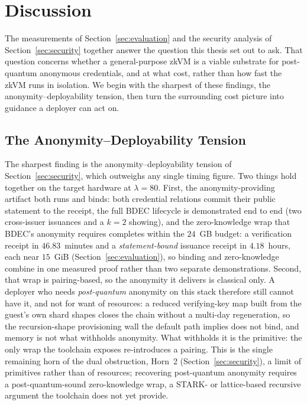 \section{Discussion}\label{sec:discussion}
The measurements of Section~\ref{sec:evaluation} and the security analysis of Section~\ref{sec:security} together answer the question this thesis set out to ask. That question concerns whether a general-purpose zkVM is a viable substrate for post-quantum anonymous credentials, and at what cost, rather than how fast the zkVM runs in isolation. We begin with the sharpest of these findings, the anonymity--deployability tension, then turn the surrounding cost picture into guidance a deployer can act on.

\subsection{The Anonymity--Deployability Tension}\label{ssec:tension-discussion}
The sharpest finding is the anonymity--deployability tension of Section~\ref{sec:security}, which outweighs any single timing figure. Two things hold together on the target hardware at $\lambda=80$. First, the anonymity-providing artifact both runs and binds: both credential relations commit their public statement to the receipt, the full BDEC lifecycle is demonstrated end to end (two cross-issuer issuances and a $k=2$ showing), and the zero-knowledge wrap that BDEC's anonymity requires completes within the $24$~GB budget: a verification receipt in $46.83$~minutes and a \emph{statement-bound} issuance receipt in $4.18$~hours, each near $15$~GiB (Section~\ref{sec:evaluation}), so binding and zero-knowledge combine in one measured proof rather than two separate demonstrations. Second, that wrap is pairing-based, so the anonymity it delivers is classical only. A deployer who needs \emph{post-quantum} anonymity on this stack therefore still cannot have it, and not for want of resources: a reduced verifying-key map built from the guest's own shard shapes closes the chain without a multi-day regeneration, so the recursion-shape provisioning wall the default path implies does not bind, and memory is not what withholds anonymity. What withholds it is the primitive: the only wrap the toolchain exposes re-introduces a pairing. This is the single remaining horn of the dual obstruction, Horn~2 (Section~\ref{sec:security}), a limit of primitives rather than of resources; recovering post-quantum anonymity requires a post-quantum-sound zero-knowledge wrap, a STARK- or lattice-based recursive argument the toolchain does not yet provide.

